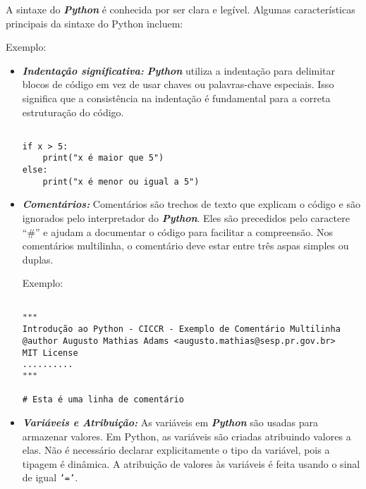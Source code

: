\documentclass[a4paper, 12pt, onecolumn,singlespacing]{article}
\begin{document}
	A sintaxe do \textbf{\textit{Python}} é conhecida por ser clara e legível. Algumas características principais da sintaxe do Python incluem:
	
	Exemplo:
	
	\begin{itemize}
		
		\item \textbf{\textit{Indentação significativa:}} \textbf{\textit{Python}} utiliza a indentação para delimitar blocos de código em vez de usar chaves ou palavras-chave especiais. Isso significa que a consistência na indentação é fundamental para a correta estruturação do código.

	\begin{verbatim}
			
if x > 5:
	print("x é maior que 5")
else:
	print("x é menor ou igual a 5")

	\end{verbatim}
	\label{exemplo_curto_identacao}

	\item \textbf{\textit{Comentários:}} Comentários são trechos de texto que explicam o código e são ignorados pelo interpretador do \textit{\textbf{Python}}. Eles são precedidos pelo caractere ``\#'' e ajudam a documentar o código para facilitar a compreensão. Nos comentários multilinha, o comentário deve estar entre três aspas simples ou duplas.
	
	Exemplo:
	
	\begin{verbatim}
			
"""
Introdução ao Python - CICCR - Exemplo de Comentário Multilinha
@author Augusto Mathias Adams <augusto.mathias@sesp.pr.gov.br>
MIT License
..........
"""

# Esta é uma linha de comentário

	\end{verbatim}
\label{exemplo_curto_comentário}

	\item \textbf{\textit{Variáveis e Atribuição:}} As variáveis em \textbf{\textit{Python}} são usadas para armazenar valores. Em Python, as variáveis são criadas atribuindo valores a elas. Não é necessário declarar explicitamente o tipo da variável, pois a tipagem é dinâmica. A atribuição de valores às variáveis é feita usando o sinal de igual \texttt{'='}.
	

\end{itemize}
\end{document}
